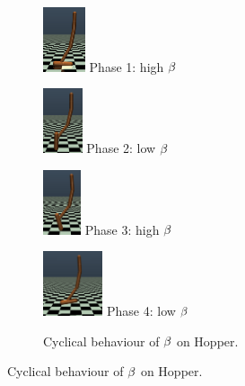 \begin{figure}[h]
\centering
\begin{subfigure}{.45\textwidth}
    \centering
    \begin{minipage}[b]{0.4\linewidth}
    \centering
    \includegraphics[width=\textwidth,height=1.9cm]{fig/phase_0.png}
    Phase 1: high $\beta$
    \label{fig:phase_0}
    \end{minipage}
    \hspace{0.05cm}
    \begin{minipage}[b]{0.4\linewidth}
    \centering
    \includegraphics[width=\textwidth,height=1.9cm]{fig/phase_1.png}
    Phase 2: low $\beta$
    \label{fig:phase_1}
    \end{minipage}
    \hspace{0.02cm}
    \begin{minipage}[b]{0.4\linewidth}
    \centering
    \includegraphics[width=\textwidth,height=1.9cm]{fig/phase_2.png}
    Phase 3: high $\beta$
    \label{fig:phase_2}
    \end{minipage}
    \vspace{0.02cm}
    \hspace{0.02cm}
    \begin{minipage}[b]{0.4\linewidth}
    \centering
    \includegraphics[width=\textwidth,height=1.9cm]{fig/phase_3.png}
     Phase 4: low $\beta$
    \label{fig:phase_3}
    \end{minipage}
    \hspace{0.02cm}
    \caption{Cyclical behaviour of $\beta$ on Hopper.}
    \label{fig:visual_hopper}

\end{subfigure}
\end{figure}

